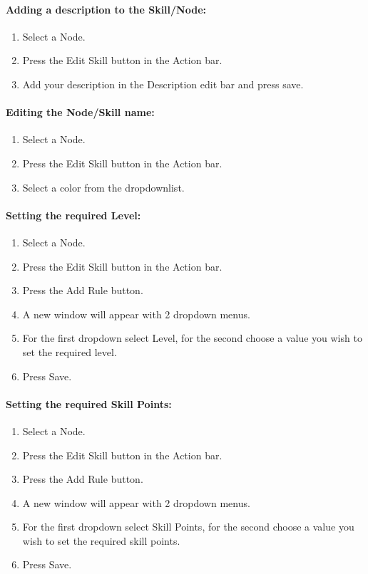 \documentclass[12pt]{article}
\begin{document}
\paragraph{Adding a description to the Skill/Node:}
\begin{enumerate}
	\item Select a Node.
	\item Press the Edit Skill button in the Action bar.
	\item Add your description in the Description edit bar and press save.
\end{enumerate}

\paragraph{Editing the Node/Skill name:}
\begin{enumerate}
	\item Select a Node.
	\item Press the Edit Skill button in the Action bar.
	\item Select a color from the dropdownlist.
\end{enumerate}

\paragraph{Setting the required Level:}
\begin{enumerate}
	\item Select a Node.
	\item Press the Edit Skill button in the Action bar.
	\item Press the Add Rule button.
	\item A new window will appear with 2 dropdown menus.
	\item For the first dropdown select Level, for the second choose a value you wish to set the required level.
	\item Press Save.
\end{enumerate}

\paragraph{Setting the required Skill Points:}
\begin{enumerate}
	\item Select a Node.
	\item Press the Edit Skill button in the Action bar.
	\item Press the Add Rule button.
	\item A new window will appear with 2 dropdown menus.
	\item For the first dropdown select Skill Points, for the second choose a value you wish to set the required skill points.
	\item Press Save.
\end{enumerate}
\end{document}
